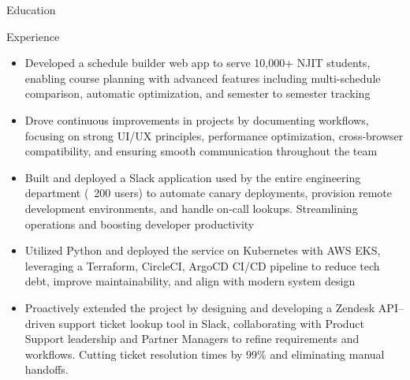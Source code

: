 \documentclass{resume}
\begin{document}
\introduction[
    fullname={Declan Blanchard},
    email={declanblanc@gmail.com},
    linkedin={linkedin.com/in/declanblanc},
    github={github.com/declanblanc}
]

\begin{educationSection}{Education}
    \educationItem[
        university={New Jersey Institute of Technology},
        graduation={May 2026},
        grade={3.8 GPA},
        program={Bachelor's, Computer Science}
    ]
\end{educationSection}

\begin{experienceSection}{Experience}

    \experienceItem[
        company={New Jersey Institute of Technology},
        location={Newark, NJ},
        position={Full Stack Developer},
        duration={January 2025 - Present}
    ]
    \begin{itemize}[itemsep=-6pt, leftmargin=1.2em, rightmargin=0.8em, before=\raggedright, after=\normalfont]
        \item Developed a schedule builder web app to serve 10,000+ NJIT students, enabling course planning with advanced features including multi-schedule comparison, automatic optimization, and semester to semester tracking
        \item Drove continuous improvements in projects by documenting workflows, focusing on strong UI/UX principles, performance optimization, cross-browser compatibility, and ensuring smooth communication throughout the team
    \end{itemize}
    \experienceItem[
        company={Patreon},
        location={New York, NY},
        position={Software Engineer Intern},
        duration={May 2025 - August 2025}
    ]
    \begin{itemize}[itemsep=-6pt, leftmargin=1.2em, rightmargin=0.8em, before=\raggedright, after=\normalfont]
        \item Built and deployed a Slack application used by the entire engineering department (\string~200 users) to automate canary deployments, provision remote development environments, and handle on-call lookups. Streamlining operations and boosting developer productivity
        \item Utilized Python and deployed the service on Kubernetes with AWS EKS, leveraging a Terraform, CircleCI, ArgoCD CI/CD pipeline to reduce tech debt, improve maintainability, and align with modern system design
        \item Proactively extended the project by designing and developing a Zendesk API–driven support ticket lookup tool in Slack, collaborating with Product Support leadership and Partner Managers to refine requirements and workflows. Cutting ticket resolution times by 99\% and eliminating manual handoffs.
    \end{itemize}





\end{experienceSection}
\end{document}
